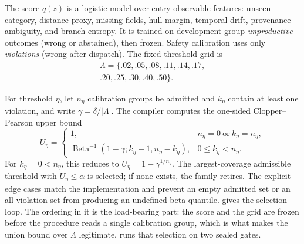 The score $q(z)$ is a logistic model over entry-observable features: unseen category,
distance proxy, missing fields, hull margin, temporal drift, provenance ambiguity, and
branch entropy.  It is trained on development-group \emph{unproductive} outcomes
(wrong or abstained), then frozen.  Safety calibration uses only \emph{violations}
(wrong after dispatch).  The fixed threshold grid is
\begin{equation*}
\begin{gathered}
\Lambda=\{.02,.05,.08,.11,.14,.17,\\
.20,.25,.30,.40,.50\}.
\end{gathered}
\end{equation*}

For threshold $\eta$, let $n_\eta$ calibration groups be admitted and $k_\eta$ contain
at least one violation, and write $\gamma=\delta/|\Lambda|$.  The compiler computes the
one-sided Clopper--Pearson upper bound~\cite{clopper1934binomial}
\begin{equation}
  U_\eta=
  \begin{cases}
    1, & n_\eta=0\ \text{or}\ k_\eta=n_\eta,\\
    \operatorname{Beta}^{-1}(1-\gamma;k_\eta+1,n_\eta-k_\eta),
      & 0\leq k_\eta<n_\eta.
  \end{cases}
  \label{eq:cp}
\end{equation}
For $k_\eta=0<n_\eta$, this reduces to
$U_\eta=1-\gamma^{1/n_\eta}$.  The largest-coverage admissible threshold with
$U_\eta\leq\alpha$ is selected; if none exists, the family retires.  The explicit edge
cases match the implementation and prevent an empty admitted set or an all-violation set
from producing an undefined beta quantile.   gives the selection loop.
The ordering in it is the load-bearing part: the score and the grid are frozen before the
procedure reads a single calibration group, which is what makes the union bound over
$\Lambda$ legitimate.   runs that selection on two sealed
gates.

